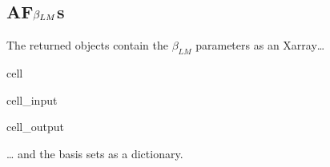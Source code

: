 \documentclass[letterpaper,table,10pt,english]{jupyterBook}
\begin{document}
\subsection{AF\sphinxhyphen{}\protect\(\beta_{LM}\protect\)s}
\label{\detokenize{part2/basic_fitting_numerics_intro_260423:af-beta-lm-s}}
\sphinxAtStartPar
The returned objects contain the \(\beta_{LM}\) parameters as an Xarray…

\begin{sphinxuseclass}{cell}\begin{sphinxVerbatimInput}

\begin{sphinxuseclass}{cell_input}
\begin{sphinxVerbatim}[commandchars=\\\{\}]
\end{sphinxVerbatim}

\end{sphinxuseclass}\end{sphinxVerbatimInput}
\begin{sphinxVerbatimOutput}

\begin{sphinxuseclass}{cell_output}
\noindent{}

\end{sphinxuseclass}\end{sphinxVerbatimOutput}

\end{sphinxuseclass}
\sphinxAtStartPar
… and the basis sets as a dictionary.
\end{document}
